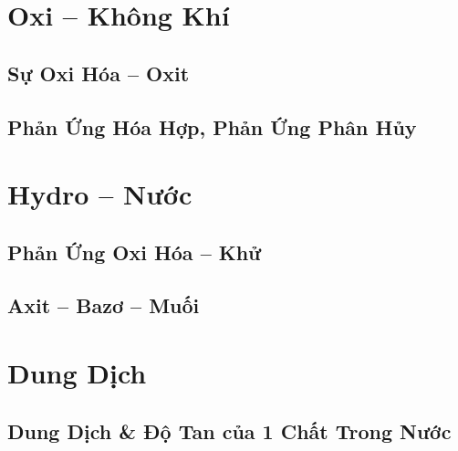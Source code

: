 \documentclass{article}
\numberwithin{equation}{section}
\begin{document}

\section{Oxi -- Không Khí}

\subsection{Sự Oxi Hóa -- Oxit}


\subsection{Phản Ứng Hóa Hợp, Phản Ứng Phân Hủy}


\section{Hydro -- Nước}

\subsection{Phản Ứng Oxi Hóa -- Khử}


\subsection{Axit -- Bazơ -- Muối}


\section{Dung Dịch}

\subsection{Dung Dịch \& Độ Tan của 1 Chất Trong Nước}

\end{document}
